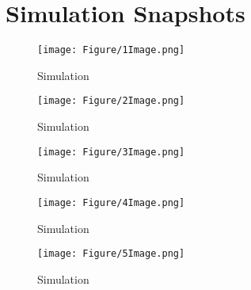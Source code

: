 \section{Simulation Snapshots}
\begin{comment}
- not sure if i just use 2 
- background kinda bad?!
\end{comment}
\begin{figure}[!h]
	\begin{center}
		\texttt{[image: Figure/1Image.png]}
	\end{center}
	\caption[Simulation]{Simulation }
	\label{Simulation1}
\end{figure}
\begin{figure}[!h]
	\begin{center}
		\texttt{[image: Figure/2Image.png]}
	\end{center}
	\caption[Simulation]{Simulation}
	\label{Simulation2}
\end{figure}
\begin{figure}[!h]
	\begin{center}
		\texttt{[image: Figure/3Image.png]}
	\end{center}
	\caption[Simulation]{Simulation }
	\label{Simulation3}
\end{figure}
\begin{figure}[!h]
	\begin{center}
		\texttt{[image: Figure/4Image.png]}
	\end{center}
	\caption[Simulation]{Simulation }
	\label{Simulation4}
\end{figure}
\begin{figure}[!h]
	\begin{center}
		\texttt{[image: Figure/5Image.png]}
	\end{center}
	\caption[Simulation]{Simulation }
	\label{Simulation5}
\end{figure}